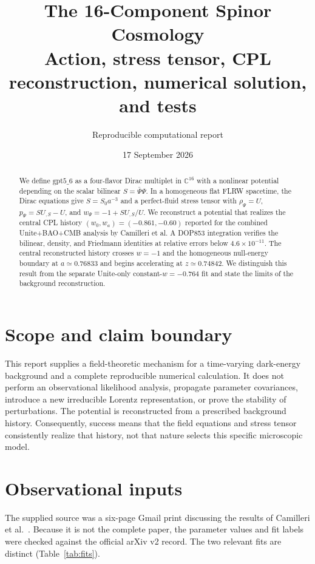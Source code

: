 \documentclass[11pt]{article}
\title{The \texorpdfstring{\gptfield}{gpt5-6} 16-Component Spinor Cosmology\\
\large Action, stress tensor, CPL reconstruction, numerical solution, and tests}
\author{Reproducible computational report}
\date{17 September 2026}
\newcommand{\gptfield}{\ensuremath{\mathrm{gpt5\_6}}}
\begin{document}
\maketitle

\begin{abstract}
We define \gptfield{} as a four-flavor Dirac multiplet in
$\mathbb C^{16}$ with a nonlinear potential depending on the scalar bilinear
$S=\bar\Psi\Psi$.  In a homogeneous flat FLRW spacetime, the Dirac equations
give $S=S_0a^{-3}$ and a perfect-fluid stress tensor with
$\rho_\Psi=U$, $p_\Psi=SU_{,S}-U$, and
$w_\Psi=-1+SU_{,S}/U$.  We reconstruct a potential that realizes the central
CPL history $(w_0,w_a)=(-0.861,-0.60)$ reported for the combined
Unite+BAO+CMB analysis by Camilleri et al.  A DOP853 integration verifies the
bilinear, density, and Friedmann identities at relative errors below
$4.6\times10^{-11}$.  The central reconstructed history crosses $w=-1$ and the
homogeneous null-energy boundary at $a\simeq0.76833$ and begins accelerating at
$z\simeq0.74842$.  We distinguish this result from the separate Unite-only
constant-$w=-0.764$ fit and state the limits of the background reconstruction.
\end{abstract}

\tableofcontents

\section{Scope and claim boundary}

This report supplies a field-theoretic mechanism for a time-varying
dark-energy background and a complete reproducible numerical calculation.  It
does not perform an observational likelihood analysis, propagate parameter
covariances, introduce a new irreducible Lorentz representation, or prove the
stability of perturbations.  The potential is reconstructed from a prescribed
background history.  Consequently, success means that the field equations and
stress tensor consistently realize that history, not that nature selects this
specific microscopic model.

\section{Observational inputs}

The supplied source was a six-page Gmail print discussing the results of
Camilleri et al.\ \cite{camilleri}.  Because it is not the complete paper, the
parameter values and fit labels were checked against the official arXiv v2
record.  The two relevant fits are distinct (Table~\ref{tab:fits}).
\end{document}
